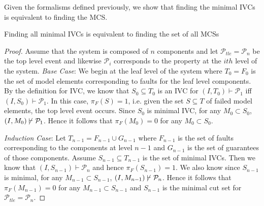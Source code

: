 Given the formalisms defined previously, we show that finding the minimal IVCs is equivalent to finding the MCS. \\

\begin{theorem} Finding all minimal IVCs is equivalent to finding the set of all MCSs\\

\begin{proof} 
Assume that the system is composed of $n$ components and let $\mathcal{P}_{tle} = \mathcal{P}_n$ be the top level event and likewise $\mathcal{P}_{i}$ corresponds to the property at the $i{th}$ level of the system. 
\textit{Base Case}:
We begin at the leaf level of the system where $T_0 = F_0$ is the set of model elements corresponding to faults for the leaf level components. By the definition for IVC, we know that $S_0 \subseteq T_0$ is an IVC for $(I, T_0) \vdash \mathcal{P}_{1}$ iff $(I, S_0) \vdash \mathcal{P}_{1}$.
In this case, $\pi_F(S) = 1$, i.e. given the set $S \subseteq T$ of failed model elements, the top level event occurs. 
Since $S_0$ is minimal IVC, for any $M_0 \subset S_0$, $(I, M_0) \mkern-2mu\not\mkern2mu\vdash \mathcal{P}_{1}$. Hence it follows that $\pi_F(M_0) = 0$ for any $M_0 \subset S_0$.

\textit{Induction Case}:
Let $T_{n-1} = F_{n-1} \cup G_{n-1}$ where $F_{n-1}$ is the set of faults corresponding to the components at level ${n-1}$ and $G_{n-1}$ is the set of guarantees of those components. Assume $S_{n-1} \subseteq T_{n-1}$ is the set of minimal IVCs. Then we know that $(I, S_{n-1}) \vdash \mathcal{P}_{n}$ and hence $\pi_F(S_{n-1}) = 1$. We also know since $S_{n-1}$ is minimal, for any $M_{n-1} \subset S_{n-1}$, $(I, M_{n-1}) \mkern-2mu\not\mkern2mu\vdash \mathcal{P}_{n}$. Hence it follows that $\pi_F(M_{n-1}) = 0$ for any $M_{n-1} \subset S_{n-1}$ and $S_{n-1}$ is the minimal cut set for $\mathcal{P}_{tle} = \mathcal{P}_n$.

\end{proof}
\end{theorem}

 



